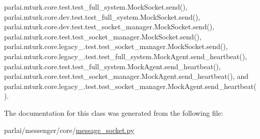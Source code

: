 parlai.\+mturk.\+core.\+test.\+test\+\_\+full\+\_\+system.\+Mock\+Socket.\+send(), parlai.\+mturk.\+core.\+dev.\+test.\+test\+\_\+full\+\_\+system.\+Mock\+Socket.\+send(), parlai.\+mturk.\+core.\+dev.\+test.\+test\+\_\+socket\+\_\+manager.\+Mock\+Socket.\+send(), parlai.\+mturk.\+core.\+test.\+test\+\_\+socket\+\_\+manager.\+Mock\+Socket.\+send(), parlai.\+mturk.\+core.\+legacy\+\_.\+test.\+test\+\_\+socket\+\_\+manager.\+Mock\+Socket.\+send(), parlai.\+mturk.\+core.\+legacy\+\_.\+test.\+test\+\_\+full\+\_\+system.\+Mock\+Agent.\+send\+\_\+heartbeat(), parlai.\+mturk.\+core.\+test.\+test\+\_\+full\+\_\+system.\+Mock\+Agent.\+send\+\_\+heartbeat(), parlai.\+mturk.\+core.\+test.\+test\+\_\+socket\+\_\+manager.\+Mock\+Agent.\+send\+\_\+heartbeat(), and parlai.\+mturk.\+core.\+legacy\+\_.\+test.\+test\+\_\+socket\+\_\+manager.\+Mock\+Agent.\+send\+\_\+heartbeat().



The documentation for this class was generated from the following file\+:\begin{DoxyCompactItemize}
\item 
parlai/messenger/core/\hyperlink{message__socket_8py}{message\+\_\+socket.\+py}\end{DoxyCompactItemize}
